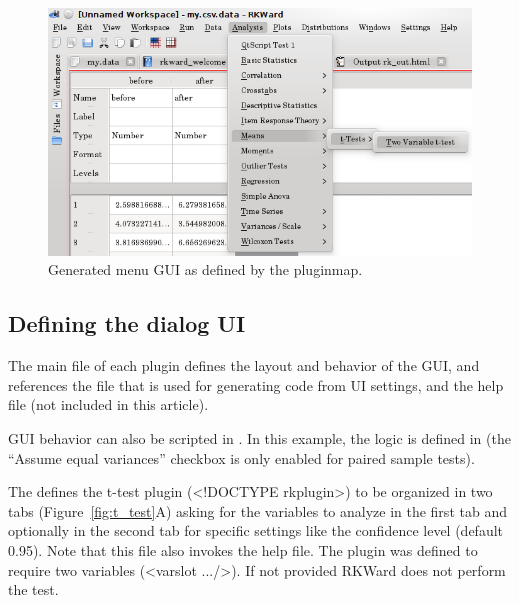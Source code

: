 \begin{figure}[htp]
 \centering
 \includegraphics{../figures/ttest-gui-example.png}
 \caption{Generated menu GUI as defined by the pluginmap.}
 \label{fig:ttest-gui-example}
\end{figure}


\subsection {Defining the dialog UI}
\label{sec:defining_dialog_ui}
The main  file of each plugin defines the layout and behavior of the GUI, and references the
 file that is used for generating  code from UI settings, and the help file (not included in this article).

GUI behavior can also be scripted in . In this example, the logic is defined in  (the ``Assume equal variances'' checkbox
is only enabled for paired sample tests).

The  defines the t-test plugin (<!DOCTYPE rkplugin>) to be organized in two tabs (Figure~\ref{fig:t_test}A) asking for the variables
to analyze in the first tab and optionally in the second tab for specific settings like the confidence level (default 0.95). Note that this  file
also invokes the  help file. The plugin was defined to require two variables (<varslot .../>). If not provided RKWard does not perform the test. 


